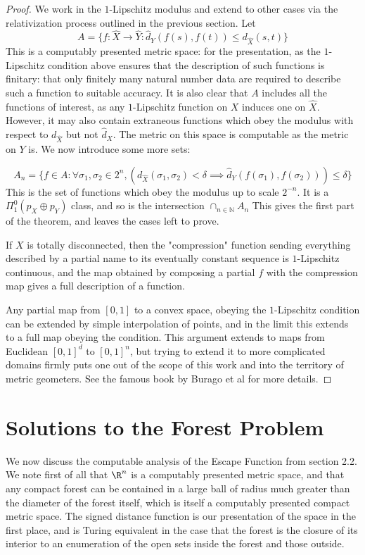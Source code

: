 \documentclass{journal}
\theoremstyle{definition}
\newcommand{\N}{\mathbb{N}}
\begin{document}
\begin{proof}
We work in the $1$-Lipschitz modulus and extend to other cases via the relativization process outlined in the previous section. Let 
$$A = \{f:\hat{X}\rightarrow \hat{Y}:  \hat{d}_{Y}(f(s),f(t)) \leq d_{\hat{X}}(s,t)\} $$
This is a computably presented metric space: for the presentation, as the $1$-Lipschitz condition above ensures that the description of such functions is finitary: that only finitely many natural number data are required to describe such a function to suitable accuracy. It is also clear that $A$ includes all the functions of interest, as any $1$-Lipschitz function on $X$ induces one on $\hat{X}$. However, it may also contain extraneous functions which obey the modulus with respect to $d_{\hat{X}}$ but not $\hat{d}_X$. The metric on this space is computable as the metric on $Y$ is. We now introduce some more sets:

$$A_n = \{f\in A: \forall \sigma_1,\sigma_2\in 2^n, (d_{\hat{X}}(\sigma_1,\sigma_2) < \delta \implies \hat{d}_Y(f(\sigma_1), f(\sigma_2))) \leq\delta\}$$
This is the set of functions which obey the modulus up to scale $2^{-n}$. It is a $\Pi^0_1(p_X\oplus p_Y)$ class, and so is the intersection $\cap_{n\in\N} A_n$ This gives the first part of the theorem, and leaves the cases left to prove.

If $X$ is totally disconnected, then the "compression" function sending everything described by a partial name to its eventually constant sequence is $1$-Lipschitz continuous, and the map obtained by composing a partial $f$ with the compression map gives a full description of a function.

Any partial map from $[0,1]$ to a convex space, obeying the $1$-Lipschitz condition can be extended by simple interpolation of points, and in the limit this extends to a full map obeying the condition. This argument extends to maps from Euclidean $[0,1]^d$ to $[0,1]^n$, but trying to extend it to more complicated domains firmly puts one out of the scope of this work and into the territory of metric geometers. See the famous book by Burago et al \cite{bbi} for more details.
\end{proof}

\section{Solutions to the Forest Problem}
\label{sec:four}
We now discuss the computable analysis of the Escape Function from section 2.2. We note first of all that $\R^n$ is a computably presented metric space, and that any compact forest can be contained in a large ball of radius much greater than the diameter of the forest itself, which is itself a computably presented compact metric space. The signed distance function is our presentation of the space in the first place, and is Turing equivalent in the case that the forest is the closure of its interior to an enumeration of the open sets inside the forest and those outside.
\end{document}
